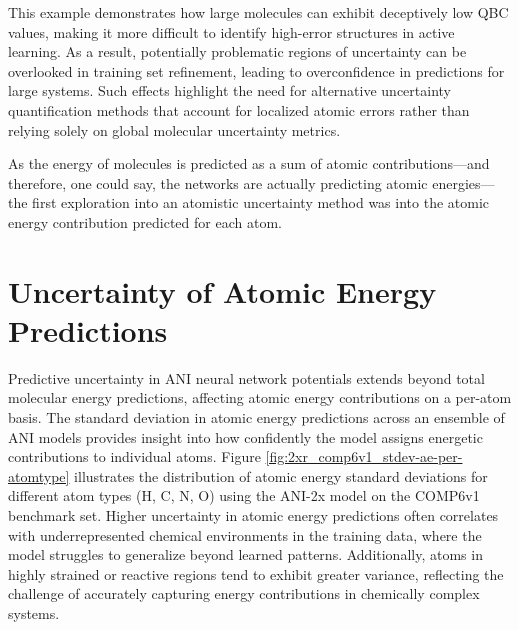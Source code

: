 This example demonstrates how large molecules can exhibit deceptively low QBC values, making it more difficult to identify high-error structures in active learning. As a result, potentially problematic regions of uncertainty can be overlooked in training set refinement, leading to overconfidence in predictions for large systems. Such effects highlight the need for alternative uncertainty quantification methods that account for localized atomic errors rather than relying solely on global molecular uncertainty metrics.

As the energy of molecules is predicted as a sum of atomic contributions---and therefore, one could say, the networks are actually predicting atomic energies---the first exploration into an atomistic uncertainty method was into the atomic energy contribution predicted for each atom.

\section{Uncertainty of Atomic Energy Predictions}
\label{sec:uncertainty_atomic_energies}

Predictive uncertainty in ANI neural network potentials extends beyond total molecular energy predictions, affecting atomic energy contributions on a per-atom basis. The standard deviation in atomic energy predictions across an ensemble of ANI models provides insight into how confidently the model assigns energetic contributions to individual atoms. Figure \ref{fig:2xr_comp6v1_stdev-ae-per-atomtype} illustrates the distribution of atomic energy standard deviations for different atom types (H, C, N, O) using the ANI-2x model on the COMP6v1 benchmark set. Higher uncertainty in atomic energy predictions often correlates with underrepresented chemical environments in the training data, where the model struggles to generalize beyond learned patterns. Additionally, atoms in highly strained or reactive regions tend to exhibit greater variance, reflecting the challenge of accurately capturing energy contributions in chemically complex systems.

